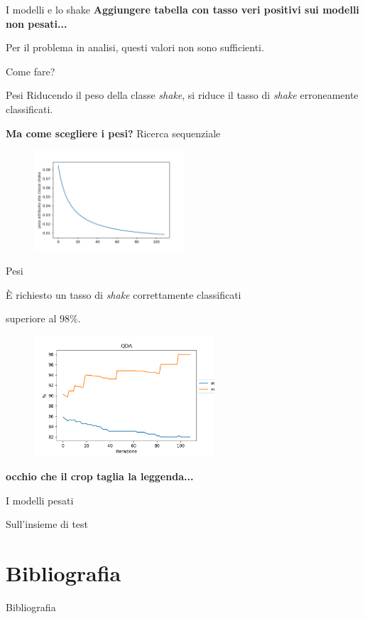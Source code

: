 \documentclass{beamer}
\begin{document}
\begin{frame}{I modelli e lo shake}
\textbf{Aggiungere tabella con tasso veri positivi sui modelli non pesati...}

Per il problema in analisi, questi valori non sono sufficienti. 

Come fare?
\end{frame}

\begin{frame}{Pesi}
Riducendo il peso della classe {\em shake}, si riduce il tasso di {\em shake} erroneamente classificati.

\textbf{Ma come scegliere i pesi?} \pause Ricerca sequenziale
\begin{figure}[H]
\includegraphics[width=0.5\textwidth]{../figure/andamento-pesi.png}
\end{figure}

\end{frame}

\begin{frame}{Pesi}
\begin{center}
È richiesto un tasso di {\em shake} correttamente classificati 

superiore al $98\%$.
\end{center}
\begin{figure}[H]
\includegraphics[width=0.6\textwidth]{../figure/acc-vs-veripos-qda.png}  
\end{figure}

\textbf{occhio che il crop taglia la leggenda...}

\end{frame}

\begin{frame}{I modelli pesati}

\end{frame}

\begin{frame}{Sull'insieme di test}

\end{frame}

\section{Bibliografia}
\begin{frame}{Bibliografia}
\printbibliography
\end{frame}
\end{document}
